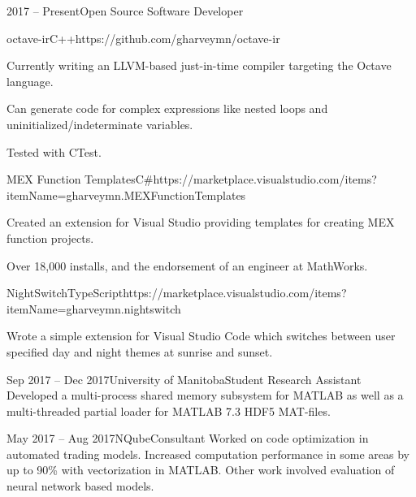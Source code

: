 \documentclass[
  9pt, %
]{FreemanCV}
\begin{document}
\begin{paracol}{2}
\begin{jobentry}{2017 -- Present}{}{Open Source Software Developer}
\begin{description}[
    noitemsep,
    topsep=0pt,
    labelindent=1em,
    leftmargin=*,
    labelsep=0pt,
    rightmargin=1em
  ]
    \item
    \begin{project*}{octave-ir}{C++}{https://github.com/gharveymn/octave-ir}
      \item Currently writing an LLVM-based just-in-time compiler targeting the Octave language.
      \item Can generate code for complex expressions like nested loops and uninitialized/indeterminate
            variables.
      \item Tested with CTest.
    \end{project*}

    \item
    \begin{project*}{MEX Function Templates}{C\#}{https://marketplace.visualstudio.com/items?itemName=gharveymn.MEXFunctionTemplates}
      \item Created an extension for Visual Studio providing templates for creating MEX function projects.
      \item Over 18,000 installs, and the endorsement of an engineer at MathWorks.
    \end{project*}

    \item
    \begin{project*}{NightSwitch}{TypeScript}{https://marketplace.visualstudio.com/items?itemName=gharveymn.nightswitch}
      \item Wrote a simple extension for Visual Studio Code which switches between user specified
            day and night themes at sunrise and sunset.
    \end{project*}
  \end{description}
\end{jobentry}

\begin{jobentry}{Sep 2017 -- Dec 2017}{University of Manitoba}{Student Research Assistant}
  Developed a multi-process shared memory subsystem for MATLAB as well as a multi-threaded
  partial loader for MATLAB 7.3 HDF5 MAT-files.
\end{jobentry}

\begin{jobentry}{May 2017 -- Aug 2017}{NQube}{Consultant}
  Worked on code optimization in automated trading models. Increased computation performance
  in some areas by up to 90\% with vectorization in MATLAB. Other work involved evaluation of
  neural network based models.
\end{jobentry}


\end{paracol}
\end{document}
